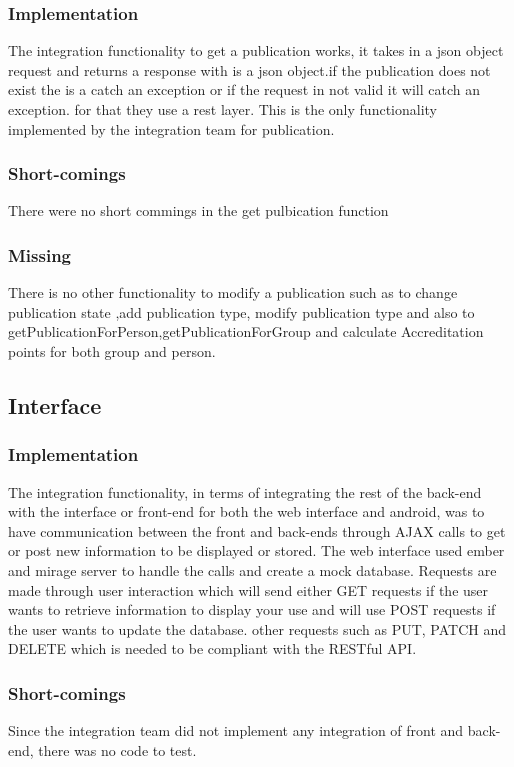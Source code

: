 \documentclass{article}
\begin{document}
		\subsubsection{Implementation}
			The integration functionality to get a publication works, it takes in a json object request and returns a response with is a json object.if the publication does not exist the is a catch an exception or if the request in not valid it will catch an exception. for that they use a rest layer. This is the only functionality implemented by the integration team for publication.
		\subsubsection{Short-comings}
		There were no short commings in the get pulbication function
		\subsubsection{Missing}
		There is no other functionality to modify a publication such as to change publication state ,add publication type, modify publication type and also to getPublicationForPerson,getPublicationForGroup and calculate Accreditation points for both group and person.
		
    \subsection{Interface}
        \subsubsection{Implementation}
        The integration functionality, in terms of integrating the rest of the back-end with the interface or front-end for both the web interface and android, was to have communication between the front and back-ends through AJAX calls to get or post new information to be displayed or stored. The web interface used ember and mirage server to handle the calls and create a mock database. Requests are made through user interaction which will send either GET requests if the user wants to retrieve information to display your use and will use POST requests if the user wants to update the database. other requests such as PUT, PATCH and DELETE which is needed to be compliant with the RESTful API.
        \subsubsection{Short-comings}
        Since the integration team did not implement any integration of front and back-end, there was no code to test.
\end{document}

